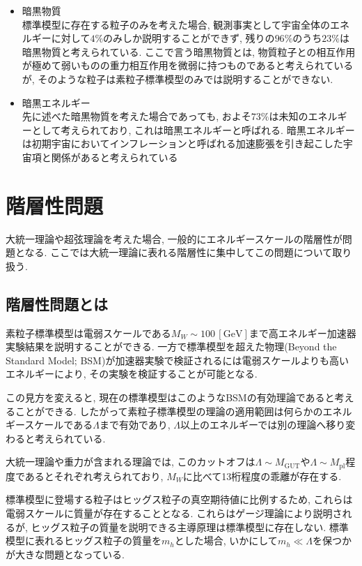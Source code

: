 \documentclass[uplatex,dvipdfmx,a4paper,titlepage]{jsbook}
\theoremstyle{plain}
\theoremstyle{definition}
\begin{document}
\begin{itemize}
      \item 暗黒物質\\
            標準模型に存在する粒子のみを考えた場合, 観測事実として宇宙全体のエネルギーに対して$4\%$のみしか説明することができず, 残りの$96\%$のうち$23\%$は暗黒物質と考えられている.
	    ここで言う暗黒物質とは, 物質粒子との相互作用が極めて弱いものの重力相互作用を微弱に持つものであると考えられているが, そのような粒子は素粒子標準模型のみでは説明することができない.
      \item 暗黒エネルギー\\
            先に述べた暗黒物質を考えた場合であっても, およそ$73\%$は未知のエネルギーとして考えられており, これは暗黒エネルギーと呼ばれる.
	    暗黒エネルギーは初期宇宙においてインフレーションと呼ばれる加速膨張を引き起こした宇宙項と関係があると考えられている
\end{itemize}



\section{階層性問題}
%
%
大統一理論や超弦理論を考えた場合, 一般的にエネルギースケールの階層性が問題となる.
ここでは大統一理論に表れる階層性に集中してこの問題について取り扱う.
\subsection{階層性問題とは}
素粒子標準模型は電弱スケールである$M_W\sim100\,[\mathrm{GeV}]$まで高エネルギー加速器実験結果を説明することができる.
一方で標準模型を超えた物理(Beyond the Standard Model; BSM)が加速器実験で検証されるには電弱スケールよりも高いエネルギーにより, その実験を検証することが可能となる.

この見方を変えると, 現在の標準模型はこのようなBSMの有効理論であると考えることができる.
したがって素粒子標準模型の理論の適用範囲は何らかのエネルギースケールである$\Lambda$まで有効であり, $\Lambda$以上のエネルギーでは別の理論へ移り変わると考えられている.

大統一理論や重力が含まれる理論では, このカットオフは$\Lambda\sim M_{\mathrm{GUT}}$や$\Lambda\sim M_{\mathrm{pl}}$程度であるとそれぞれ考えられており, $M_W$に比べて13桁程度の乖離が存在する.

標準模型に登場する粒子はヒッグス粒子の真空期待値に比例するため, これらは電弱スケールに質量が存在することとなる.
これらはゲージ理論により説明されるが, ヒッグス粒子の質量を説明できる主導原理は標準模型に存在しない.
標準模型に表れるヒッグス粒子の質量を$m_h$とした場合, いかにして$m_h \ll \Lambda$を保つかが大きな問題となっている.
\end{document}

